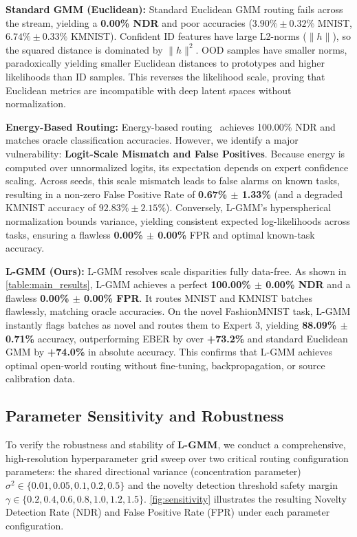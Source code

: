 \documentclass{article}
\theoremstyle{plain}
\theoremstyle{definition}
\theoremstyle{remark}
\begin{document}
\textbf{Standard GMM (Euclidean):} Standard Euclidean GMM routing fails across the stream, yielding a \textbf{0.00\% NDR} and poor accuracies ($3.90\% \pm 0.32\%$ MNIST, $6.74\% \pm 0.33\%$ KMNIST). Confident ID features have large L2-norms ($\|h\|$), so the squared distance is dominated by $\|h\|^2$. OOD samples have smaller norms, paradoxically yielding smaller Euclidean distances to prototypes and higher likelihoods than ID samples. This reverses the likelihood scale, proving that Euclidean metrics are incompatible with deep latent spaces without normalization.

\textbf{Energy-Based Routing:} Energy-based routing~\cite{liu20} achieves 100.00\% NDR and matches oracle classification accuracies. However, we identify a major vulnerability: \textbf{Logit-Scale Mismatch and False Positives}. Because energy is computed over unnormalized logits, its expectation depends on expert confidence scaling. Across seeds, this scale mismatch leads to false alarms on known tasks, resulting in a non-zero False Positive Rate of \textbf{0.67\% $\pm$ 1.33\%} (and a degraded KMNIST accuracy of $92.83\% \pm 2.15\%$). Conversely, L-GMM's hyperspherical normalization bounds variance, yielding consistent expected log-likelihoods across tasks, ensuring a flawless \textbf{0.00\% $\pm$ 0.00\%} FPR and optimal known-task accuracy.

\textbf{L-GMM (Ours):} L-GMM resolves scale disparities fully data-free. As shown in \cref{table:main_results}, L-GMM achieves a perfect \textbf{100.00\% $\pm$ 0.00\% NDR} and a flawless \textbf{0.00\% $\pm$ 0.00\% FPR}. It routes MNIST and KMNIST batches flawlessly, matching oracle accuracies. On the novel FashionMNIST task, L-GMM instantly flags batches as novel and routes them to Expert 3, yielding \textbf{88.09\% $\pm$ 0.71\%} accuracy, outperforming EBER by over \textbf{+73.2\%} and standard Euclidean GMM by \textbf{+74.0\%} in absolute accuracy. This confirms that L-GMM achieves optimal open-world routing without fine-tuning, backpropagation, or source calibration data.

\subsection{Parameter Sensitivity and Robustness}
\label{sec:sensitivity}

To verify the robustness and stability of \textbf{L-GMM}, we conduct a comprehensive, high-resolution hyperparameter grid sweep over two critical routing configuration parameters: the shared directional variance (concentration parameter) $\sigma^2 \in \{0.01, 0.05, 0.1, 0.2, 0.5\}$ and the novelty detection threshold safety margin $\gamma \in \{0.2, 0.4, 0.6, 0.8, 1.0, 1.2, 1.5\}$. \cref{fig:sensitivity} illustrates the resulting Novelty Detection Rate (NDR) and False Positive Rate (FPR) under each parameter configuration.
\end{document}
